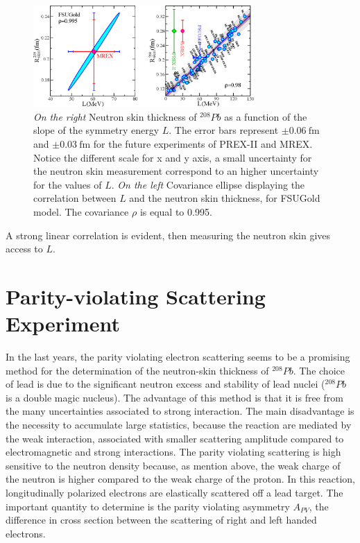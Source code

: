 \begin{figure}[hbtp]
 \centering
 \includegraphics[width=0.75\textwidth]{Introduzione/LvsR.pdf}
 \caption{\textit{On the right} Neutron skin thickness of $^{208}Pb$ as a function of the slope of the symmetry energy $L$. The error bars represent $\pm \SI{0.06}{\femto \meter}$ and $\pm \SI{0.03}{\femto \meter}$ for the future experiments of PREX-II and MREX. Notice the different scale for x and y axis, a small uncertainty for the neutron skin measurement correspond to an higher uncertainty for the values of $L$. \textit{On the left} Covariance ellipse displaying the correlation between $L$ and the neutron skin thickness, for FSUGold model. The covariance $\rho$ is equal to 0.995.}
 \label{fig:LvsR}
 \end{figure}
 
A strong linear correlation is evident, then measuring the neutron skin gives access to $L$. 
  
\section{Parity-violating Scattering Experiment}

In the last years, the parity violating electron scattering seems to be a promising method for the determination of the neutron-skin thickness of $^{208}Pb$. The choice of lead is due to the significant neutron excess and stability of lead nuclei ($^{208}Pb$ is a double magic nucleus). The advantage of this method is that it is free from the many uncertainties associated to strong interaction. The main disadvantage is the necessity to accumulate large statistics, because the reaction are mediated by the weak interaction, associated with smaller scattering amplitude compared to electromagnetic and strong interactions. 
The parity violating scattering is high sensitive to the neutron density because, as mention above, the weak charge of the neutron is higher compared to the weak charge of the proton.
In this reaction, longitudinally polarized electrons are elastically scattered off a lead target. The important quantity to determine is the parity violating asymmetry $A_{PV}$, the difference in cross section between the scattering of right and left handed electrons. 

